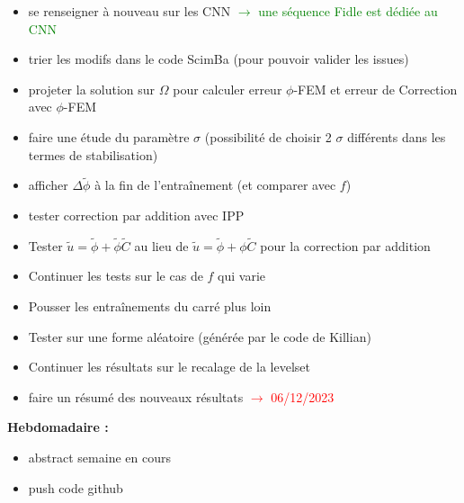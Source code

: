 \begin{itemize}[label=$\square$]
	\item[\wontfix] se renseigner à nouveau sur les CNN \textcolor{green}{$\rightarrow$ une séquence Fidle est dédiée au CNN}
	\item trier les modifs dans le code ScimBa (pour pouvoir valider les issues)
	\item[\done] projeter la solution sur $\Omega$ pour calculer erreur $\phi$-FEM et erreur de Correction avec $\phi$-FEM
	\item faire une étude du paramètre $\sigma$ (possibilité de choisir 2 $\sigma$ différents dans les termes de stabilisation)
	\item afficher $\Delta \tilde{\phi}$ à la fin de l'entraînement (et comparer avec $f$)
	\item tester correction par addition avec IPP
	\item Tester $\tilde{u}=\tilde{\phi}+\tilde{\phi}\tilde{C}$ au lieu de $\tilde{u}=\tilde{\phi}+\phi\tilde{C}$ pour la correction par addition
	\item[\done] Continuer les tests sur le cas de $f$ qui varie
	\item Pousser les entraînements du carré plus loin
	\item Tester sur une forme aléatoire (générée par le code de Killian)
	\item[\done] Continuer les résultats sur le recalage de la levelset
	\item[\done] faire un résumé des nouveaux résultats \textcolor{red}{$\rightarrow$ 06/12/2023}
\end{itemize}
\textbf{Hebdomadaire :}
\begin{itemize}[label=$\square$]
	\item[\done] abstract semaine en cours
	\item[\done] push code github
\end{itemize}